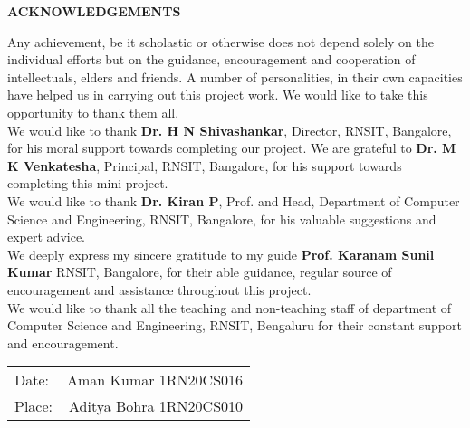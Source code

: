 \thispagestyle{empty}
\begin{center}
\textup{\large{\textbf{ACKNOWLEDGEMENTS}}} \\[0.1in]
\end{center}

\justify
\indent
Any achievement, be it scholastic or otherwise does not depend solely on the individual efforts but on the guidance, encouragement and cooperation of intellectuals, elders and friends. A number of personalities, in their own capacities have helped us in carrying out this project work. We would like to take this opportunity to thank them all. \\

We would like to thank \textbf{Dr. H N Shivashankar}, Director, RNSIT, Bangalore, for his moral support towards completing our project.
We are grateful to \textbf{Dr. M K Venkatesha}, Principal, RNSIT, Bangalore, for his support towards completing this mini project. \\

We would like to thank \textbf{Dr. Kiran P}, Prof. and Head, Department of Computer Science and Engineering, RNSIT, Bangalore, for his valuable suggestions and expert advice. \\

We deeply express my sincere gratitude to my guide \textbf{Prof. Karanam Sunil Kumar} RNSIT, Bangalore, for their able guidance, regular source of encouragement and assistance throughout this project. \\

We would like to thank all the teaching and non-teaching staff of department of Computer Science and Engineering, RNSIT, Bengaluru for their constant support and encouragement.\\[3.3in]
\justify
\begin{tabular}{l r}
\textup{Date:} & \hspace{9cm}\textup{Aman Kumar 1RN20CS016}\\
\textup{Place:} & \hspace{9cm}\textup{Aditya Bohra 1RN20CS010}
\end{tabular}


\pagebreak